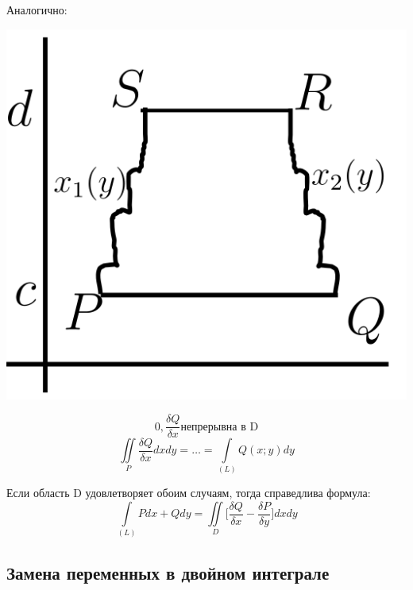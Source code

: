 \documentclass[12pt]{article}
\let\ORIincludegraphics\includegraphics
\renewcommand{\includegraphics}[2][]{\ORIincludegraphics[scale=0.65,#1]{#2}}
\let\oldint\int
\let\oldiint\iint
\renewcommand{\int}{\oldint\limits}
\renewcommand{\iint}{\oldiint\limits}
\begin{document}
  \break
  Аналогично:\\
  \par
  \begin{minipage}{0.45\textwidth}
    \includegraphics[scale=0.8]{8.15.3.png}
  \end{minipage}
  \hspace{1em}
  \begin{minipage}{0.55\textwidth}
    \[0,\frac{\delta Q}{\delta x} \text{непрерывна в D}\]
    \[\iint_P \frac{\delta Q}{\delta x}dxdy=\dots=\int_{(L)} Q(x;y)dy\] 
  \end{minipage}
  \vspace{1em}
  \par
  \begin{center}
    Если область D удовлетворяет обоим случаям, тогда справедлива формула:
    \[\boxed{\int_{(L)}Pdx+Qdy=\iint_D \Big[ \frac{\delta Q}{\delta x}-\frac{\delta P}{\delta y}\Big]dxdy}\]
  \end{center}
  \break
  \subsection{Замена переменных в двойном интеграле}
\end{document}
